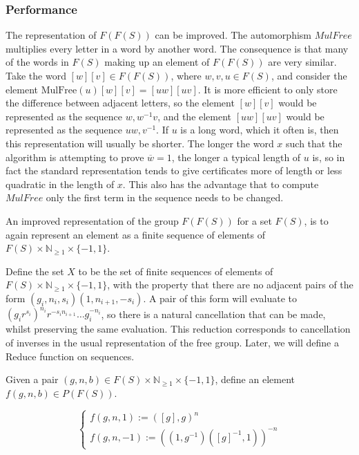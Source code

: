 \documentclass[11pt]{article} %
\theoremstyle{definition}
\theoremstyle{definition}
\theoremstyle{definition}
\theoremstyle{definition}
\theoremstyle{definition}
\theoremstyle{definition}
\begin{document}
\subsubsection{Performance}


The representation of $F(F(S))$ can be improved. The automorphism $MulFree$ multiplies
every letter in a word by another word. The consequence is that many of the words in
$F(S)$ making up an element of $F(F(S))$ are very similar. Take the word $[w][v] \in F(F(S))$,
where $w, v, u \in F(S)$, and consider the element $\text{MulFree}(u)[w][v] = [uw][uv]$.
It is more efficient to only store the difference between adjacent letters, so the
element $[w][v]$ would be represented as the sequence $w, w^{-1}v$, and
the element $[uw][uv]$ would be represented as the sequence $uw, v^{-1}$.
If $u$ is a long word, which it often is, then this representation will usually be shorter.
The longer the word $x$ such that the algorithm is attempting
to prove $\overline{w} = 1$, the longer a typical length of $u$ is, so in fact
the standard representation tends to give certificates more of length or less quadratic in
the length of $x$.
This also has the advantage that to compute $MulFree$ only the first term in the sequence needs
to be changed.

An improved representation of the group $F(F(S))$ for a set $F(S)$, is to again
represent an element as a finite sequence of elements of $F(S) \times \mathbb{N}_{\ge 1}
\times\{-1,1\}$.

Define the set $X$ to be the set of finite sequences of elements of
$F(S) \times \mathbb{N}_{\ge 1}
\times\{-1,1\}$, with the property that there are no adjacent pairs of the form
$(g_i, n_i, s_i)(1, n_{i+1}, -s_i)$. A pair of this form will evaluate
to $(g_i r^{s_i})^{n_i}r^{-s_in_{i+1}} \dots g_i^{-n_i}$,
so there is a natural cancellation that can be made, whilst preserving the same
evaluation. This reduction corresponds to cancellation of inverses in
the usual representation of the free group. Later,
we will define a Reduce function on sequences.

Given a pair $(g, n, b) \in F(S) \times \mathbb{N}_{\ge 1} \times\{-1,1\}$,
define an element $f(g, n, b) \in P(F(S))$.

\begin{equation}
  \begin{cases}
    f(g, n, 1) := ([g], g) ^ n \\
    f(g, n, -1) := ((1, g^{-1})([g]^{-1}, 1))^{-n}
  \end{cases}
\end{equation}
\end{document}

